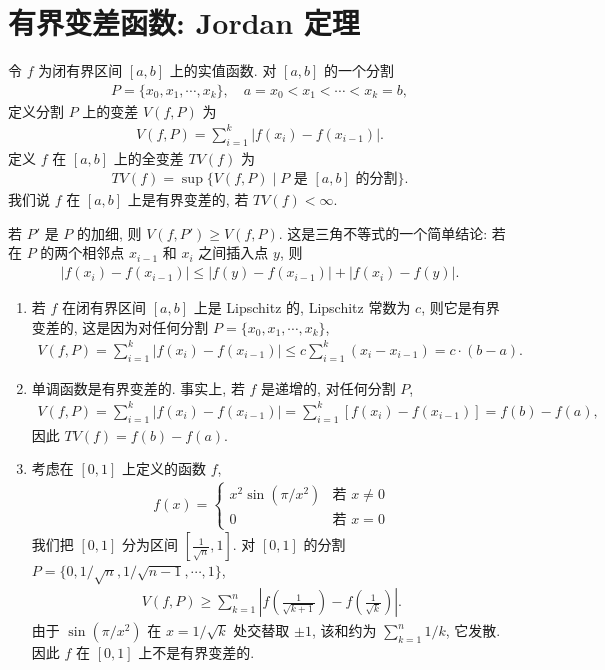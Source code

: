 \documentclass[../../main.tex]{subfiles}
\begin{document}
\section{有界变差函数: Jordan 定理}\label{section:ch06-有界变差}

令 $f$ 为闭有界区间 $[a,b]$ 上的实值函数. 对 $[a,b]$ 的一个分割
\begin{align*}
P=\{x_{0},x_{1},\cdots,x_{k}\},\quad a=x_{0}<x_{1}<\cdots<x_{k}=b,
\end{align*}
定义分割 $P$ 上的变差 $V(f,P)$ 为
\begin{align}
V(f,P)=\sum_{i=1}^{k}|f(x_{i})-f(x_{i-1})|.\label{align:ch06-变差}
\end{align}
定义 $f$ 在 $[a,b]$ 上的全变差 $TV(f)$ 为
\begin{align}
TV(f)=\sup\{V(f,P)\mid P\text{ 是 }[a,b]\text{ 的分割}\}.\label{align:ch06-全变差}
\end{align}
我们说 $f$ 在 $[a,b]$ 上是有界变差的, 若 $TV(f)<\infty$.

若 $P'$ 是 $P$ 的加细, 则 $V(f,P')\geqslant V(f,P)$. 这是三角不等式的一个简单结论: 若在 $P$ 的两个相邻点 $x_{i-1}$ 和 $x_{i}$ 之间插入点 $y$, 则
\begin{align*}
|f(x_{i})-f(x_{i-1})|\leqslant|f(y)-f(x_{i-1})|+|f(x_{i})-f(y)|.
\end{align*}

\begin{example}\label{example:ch06-有界变差例子}
\begin{enumerate}[(1)]
\item 若 $f$ 在闭有界区间 $[a,b]$ 上是 Lipschitz 的, Lipschitz 常数为 $c$, 则它是有界变差的, 这是因为对任何分割 $P=\{x_{0},x_{1},\cdots,x_{k}\}$,
\begin{align*}
V(f,P)=\sum_{i=1}^{k}|f(x_{i})-f(x_{i-1})|\leqslant c\sum_{i=1}^{k}(x_{i}-x_{i-1})=c\cdot(b-a).
\end{align*}
\item 单调函数是有界变差的. 事实上, 若 $f$ 是递增的, 对任何分割 $P$,
\begin{align*}
V(f,P)=\sum_{i=1}^{k}|f(x_{i})-f(x_{i-1})|=\sum_{i=1}^{k}[f(x_{i})-f(x_{i-1})]=f(b)-f(a),
\end{align*}
因此 $TV(f)=f(b)-f(a)$.
\item 考虑在 $[0,1]$ 上定义的函数 $f$,
\begin{align*}
f(x)=
\begin{cases}
x^{2}\sin(\pi/x^{2})&\text{若 }x\neq 0\\
0&\text{若 }x=0
\end{cases}
\end{align*}
我们把 $[0,1]$ 分为区间 $[\frac{1}{\sqrt{n}},1]$. 对 $[0,1]$ 的分割 $P=\{0,1/\sqrt{n},1/\sqrt{n-1},\cdots,1\}$,
\begin{align*}
V(f,P)\geqslant\sum_{k=1}^{n}\left|f\left(\frac{1}{\sqrt{k+1}}\right)-f\left(\frac{1}{\sqrt{k}}\right)\right|.
\end{align*}
由于 $\sin(\pi/x^{2})$ 在 $x=1/\sqrt{k}$ 处交替取 $\pm 1$, 该和约为 $\sum_{k=1}^{n}1/k$, 它发散. 因此 $f$ 在 $[0,1]$ 上不是有界变差的.
\end{enumerate}
\end{example}
\end{document}
